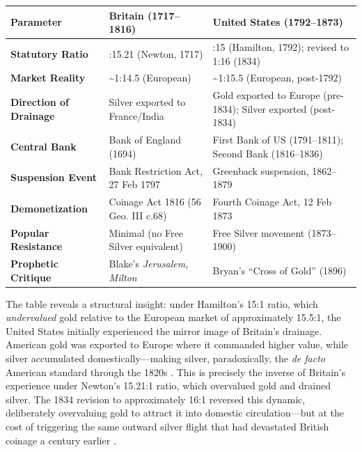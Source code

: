 \documentclass[
]{article}
\newcounter{none} %
\begin{document}
{\def\LTcaptype{none} %
\begin{longtable}[]{@{}
  >{\raggedright\arraybackslash}p{}
  >{\raggedright\arraybackslash}p{}
  >{\raggedright\arraybackslash}p{}@{}}
\toprule\noalign{}
\begin{minipage}[b]{\linewidth}\raggedright
Parameter
\end{minipage} & \begin{minipage}[b]{\linewidth}\raggedright
Britain (1717--1816)
\end{minipage} & \begin{minipage}[b]{\linewidth}\raggedright
United States (1792--1873)
\end{minipage} \\
\midrule\noalign{}
\endhead
\bottomrule\noalign{}
\endlastfoot
\textbf{Statutory Ratio} & 1:15.21 (Newton, 1717) & 1:15 (Hamilton,
1792); revised to 1:16 (1834) \\
\textbf{Market Reality} & \textasciitilde1:14.5 (European) &
\textasciitilde1:15.5 (European, post-1792) \\
\textbf{Direction of Drainage} & Silver exported to France/India & Gold
exported to Europe (pre-1834); Silver exported (post-1834) \\
\textbf{Central Bank} & Bank of England (1694) & First Bank of US
(1791--1811); Second Bank (1816--1836) \\
\textbf{Suspension Event} & Bank Restriction Act, 27 Feb 1797 &
Greenback suspension, 1862--1879 \\
\textbf{Demonetization} & Coinage Act 1816 (56 Geo. III c.68) & Fourth
Coinage Act, 12 Feb 1873 \\
\textbf{Popular Resistance} & Minimal (no Free Silver equivalent) & Free
Silver movement (1873--1900) \\
\textbf{Prophetic Critique} & Blake's \emph{Jerusalem}, \emph{Milton} &
Bryan's ``Cross of Gold'' (1896) \\
\end{longtable}
}

The table reveals a structural insight: under Hamilton's 15:1 ratio,
which \emph{undervalued} gold relative to the European market of
approximately 15.5:1, the United States initially experienced the mirror
image of Britain's drainage. American gold was exported to Europe where
it commanded higher value, while silver accumulated
domestically---making silver, paradoxically, the \emph{de facto}
American standard through the 1820s
\citep{laughlin1898bimetallism, officer2001bimetallism}. This is
precisely the inverse of Britain's experience under Newton's 15.21:1
ratio, which overvalued gold and drained silver. The 1834 revision to
approximately 16:1 reversed this dynamic, deliberately overvaluing gold
to attract it into domestic circulation---but at the cost of triggering
the same outward silver flight that had devastated British coinage a
century earlier \citep{redish1990evolution}.
\end{document}
